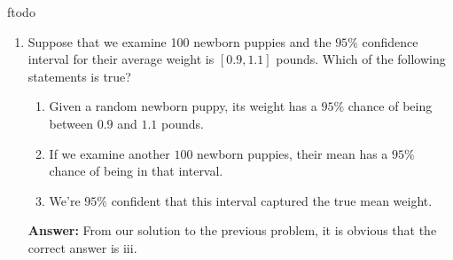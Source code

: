 ƒtodo\documentclass{article}
\newenvironment{QandA}{\begin{enumerate}[label=\arabic*.]}{\end{enumerate}}
\newenvironment{InnerQandA}{\begin{enumerate}[label=\roman*.]}{\end{enumerate}}
\newenvironment{answer}{\par\normalfont \textbf{Answer:}}{}
\newcommand{\Exp}[1]{\mathbb{E}\left[ #1 \right]}
\newcommand{\Vari}[1]{\text{Var}\left[ #1 \right]}
\begin{document}
\begin{QandA}
\begin{answer}
\begin{align*}
            &= \frac{\sigma^2}{n}
        \end{align*}
        Moreover, due to the Central Limit Theorem (CLT), the estimator $\bar{X}_n$ has approximately normal distribution. Therefore, the following derive random variable:
        \begin{align*}
            \frac{\bar{X}_n - \Exp{\bar{X}_n}}{\sqrt{\Vari{\bar{X}_n}}} = \frac{\bar{X}_n - \mu}{\sigma / \sqrt{n}} \sim N(0, 1)
        \end{align*}
        is approximately distributed as a Standard Normal variable. \\\\
        Coming back to our example, let us first note that we don't have the true population standard deviation $\sigma$. Therefore, we need to plug in a proxy -- the sample standard deviation $s$. As a rule of thumb, as long as the number of samples $n$ is larger than $50$, we can make this substitution. \\\\
        Now, by looking up the z-table, we obtain:
        \begin{align*}
            P \left( -1.96 \le \frac{\bar{X}_n - \mu}{s / \sqrt{n}} \le 1.96 \right) \approx 95 \%
        \end{align*}
        Finally, let us plug in the numbers:
        \begin{align*}
            P \left(-1.96 \le \frac{\bar{X}_n - \mu}{s / \sqrt{n}} \le 1.96 \right) &\approx 95 \%  \\
            P \left(\bar{X}_n - 1.96 \cdot \frac{s}{\sqrt{n}} \le \mu \le \bar{X}_n + 1.96 \cdot \frac{s}{\sqrt{n}} \right) &\approx 95 \% \\
            P \left(1 - 1.96 \cdot \frac{0.12}{\sqrt{100}} \le \mu \le 1 + 1.96 \cdot \frac{0.12}{\sqrt{100}} \right) &\approx 95 \% \\
            P \left(0.97648 \le \mu \le 1.02352 \right) &\approx 95 \%
        \end{align*}
    \end{answer}

    \item Suppose that we examine 100 newborn puppies and the $95\%$ confidence interval for their average weight is  $[0.9,1.1]$  pounds. Which of the following statements is true?
    \begin{InnerQandA}
        \item Given a random newborn puppy, its weight has a $95\%$ chance of being between $0.9$ and $1.1$ pounds.
        \item If we examine another $100$ newborn puppies, their mean has a $95\%$ chance of being in that interval. 
        \item We're $95\%$ confident that this interval captured the true mean weight.
    \end{InnerQandA}
    \begin{answer}
        From our solution to the previous problem, it is obvious that the correct answer is iii.
    \end{answer}


\end{QandA}
\end{document}
